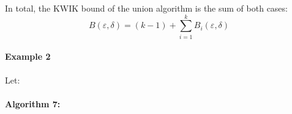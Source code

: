 In total, the KWIK bound of the union algorithm is the sum of both cases:
$$ B(\varepsilon, \delta) = (k - 1) + \sum_{i = 1}^k B_i(\varepsilon, \delta) $$


\paragraph{Example 2}
Let:

\paragraph{Algorithm 7: }
